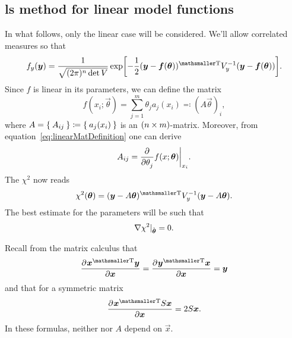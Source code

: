 \documentclass[
	10pt,
	draft
]{scrreprt}
\newcommand{\transpose}[1]{\ensuremath{#1}^{\mathrm{ \mathsmaller T}}}
\newcommand{\pderiv}[3][]{\dfrac{{\de^{#1}}#2}{\de #3^{#1}}}%
\begin{document}
		\subsection{\acs{ls} method for linear model functions}

In what follows, only the linear case will be considered.
We'll allow correlated measures so that
\begin{equation}
f_y (\vec{y}) = \frac{1}{\sqrt{(2\pi)^n\det V}}\exp
\qp[\bigg]{%
-\frac{1}{2}\transpose{(\vec{y} - \vec{f}(\vec{\theta}))}V_y^{-1}(\vec{y} - \vec{f}(\vec{\theta}))
}.
\end{equation}
Since $f$ is linear in its parameters, we can define the matrix
\begin{equation}\label{eq:linearMatDefinition}
f(x_i;\vec{\theta}) = \sum_{j=1}^m \theta_ja_j(x_i) \eqqcolon (A\vec{\theta})_i,
\end{equation}
where $A = \Set{A_{ij}} \coloneqq \Set{a_j(x_i)}$ is an $(n\times m)$-matrix.
Moreover, from equation~\eqref{eq:linearMatDefinition} one can derive
\begin{equation}
A_{ij} = \pderiv{}{\theta_j}f(x;\vec{\theta})\bigg\rvert_{%
x_i}.
\end{equation}
The $\chi^2$ now reads
\begin{equation}\label{eq:ChiSquareFunctionLinear}
\chi^2(\vec{\theta}) = \transpose{(\vec{y} - A\vec{\theta})}V_y^{-1}(\vec{y} - A\vec{\theta}).
\end{equation}
The best estimate for the parameters will be such that
\begin{equation}
\mathop{}\!\nabla \chi^2\rvert_{\hat{\bm{{\theta}}}} = 0.
\end{equation}


Recall from the matrix calculus that
\begin{equation}
\pderiv{\transpose{\vec{x}}\vec{y}}{\vec{x}} = 
\pderiv{\transpose{\vec{y}}\vec{x}}{\vec{x}} = \vec{y}
\end{equation}
and that for a symmetric matrix
\begin{equation}
\pderiv{\transpose{\vec{x}}S\vec{x}}{\vec{x}} = 2S\vec{x}.
\end{equation}
In these formulas, neither  nor $A$ depend on $\vec{x}$.
\end{document}

